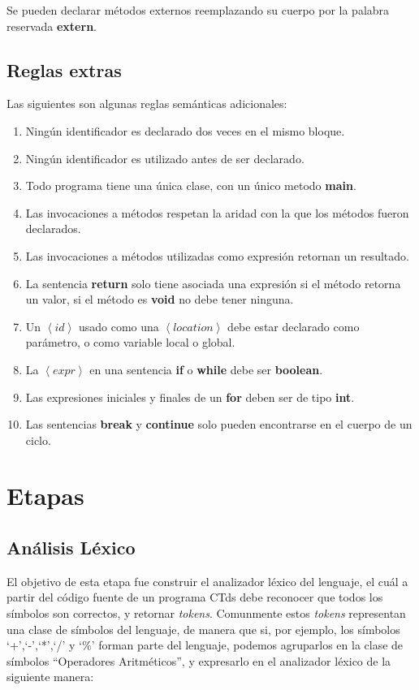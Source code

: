 \documentclass[11pt,a4paper]{article}
\begin{document}
Se pueden declarar métodos externos reemplazando su cuerpo por la palabra reservada \textbf{extern}.

\subsection{Reglas extras}
\label{extra}

Las siguientes son algunas reglas semánticas adicionales:
\begin{enumerate}
\item Ningún identificador es declarado dos veces en el mismo bloque.
\item Ningún identificador es utilizado antes de ser declarado.
\item Todo programa tiene una única clase, con un único metodo \textbf{main}.
\item Las invocaciones a métodos respetan la aridad con la que los métodos fueron declarados.
\item Las invocaciones a métodos utilizadas como expresión retornan un resultado.
\item La sentencia \textbf{return} solo tiene asociada una expresión si el método retorna un valor, si el método es \textbf{void} no debe tener ninguna.
\item Un $\left\langle id \right\rangle$ usado como una $\left\langle location \right\rangle$ debe estar declarado como parámetro, o como variable local o global.
\item La $\left\langle expr \right\rangle$ en una sentencia \textbf{if} o \textbf{while} debe ser \textbf{boolean}.
\item Las expresiones iniciales y finales de un \textbf{for} deben ser de tipo \textbf{int}.
\item Las sentencias \textbf{break} y \textbf{continue} solo pueden encontrarse en el cuerpo de un ciclo.
\end{enumerate} 
\section{Etapas} 
\label{sec:etapas}

\subsection{Análisis Léxico} 
\label{subsec:lexico}

El objetivo de esta etapa fue construir el analizador léxico del lenguaje, el cuál a partir del código fuente de un programa CTds debe reconocer que todos los símbolos son correctos, y retornar \textit{tokens}. Comunmente estos \textit{tokens} representan una clase de símbolos del lenguaje, de manera que si, por ejemplo, los símbolos `+',`-',`*',`/' y `\%' forman parte del lenguaje, podemos agruparlos en la clase de símbolos ``Operadores Aritméticos'', y expresarlo en el analizador léxico de la siguiente manera:
\\
\end{document}
